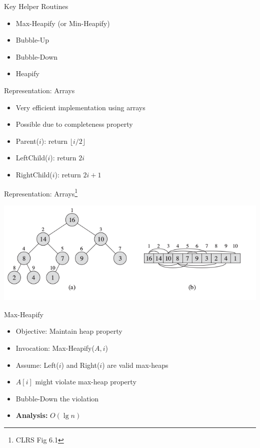 \documentclass{beamer}
\begin{document}
\begin{frame}{Key Helper Routines}
    \begin{itemize}
        \item Max-Heapify (or Min-Heapify)
        \item Bubble-Up
        \item Bubble-Down
        \item Heapify
    \end{itemize}
\end{frame}

\begin{frame}{Representation: Arrays}
    \begin{itemize}
        \item Very efficient implementation using arrays
        \item Possible due to completeness property
        \item Parent($i$): return $\lfloor i/2 \rfloor$
        \item LeftChild($i$): return $2i$
        \item RightChild($i$): return $2i+1$
    \end{itemize}
\end{frame}

\begin{frame}{Representation: Arrays\footnote{CLRS Fig 6.1}}
    \begin{center}
        \includegraphics[scale=0.4]{maxHeapRepr.png}
    \end{center}
\end{frame}



\begin{frame}{Max-Heapify}
    \begin{itemize}
        \item Objective: Maintain heap property
        \item Invocation: Max-Heapify($A,i$)
        \item Assume: Left($i$) and Right($i$) are valid max-heaps
        \item $A[i]$ might violate max-heap property
        \item Bubble-Down the violation
        \item {\bf Analysis:} $O(\lg n)$
    \end{itemize}
\end{frame}
\end{document}
